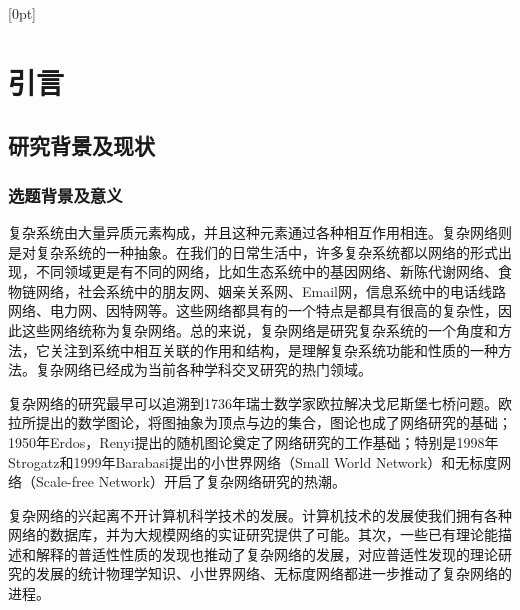\documentclass[a4paper,12pt,openany,oneside,utf-8]{ctexbook}
\newcommand{\xiaowuhao}{\fontsize{9pt}{\baselineskip}\selectfont}
\begin{document}
	
	\newpage
	\begin{spacing}{1.8}
		\tableofcontents
		[0pt]{\addvspace{2pt}\filright}
		{\contentspush{\thecontentslabel\ }}
		{}{\contentspage}
	\end{spacing}
	
	\mainmatter
	\fancyfoot[EC,OC]{\hspace*{1 em}\thepage{}\hspace*{1 em}}
	\normalsize
	\chapter[引言]{引言}\fancyhead[C]{\xiaowuhao}
	\section{研究背景及现状}
	\subsection{选题背景及意义}
	复杂系统由大量异质元素构成，并且这种元素通过各种相互作用相连。复杂网络则是对复杂系统的一种抽象。在我们的日常生活中，许多复杂系统\cite{ref1}都以网络的形式出现，不同领域更是有不同的网络，比如生态系统中的基因网络、新陈代谢网络、食物链网络，社会系统中的朋友网、姻亲关系网、Email网，信息系统中的电话线路网络、电力网、因特网等。这些网络都具有的一个特点是都具有很高的复杂性，因此这些网络统称为复杂网络。总的来说，复杂网络是研究复杂系统的一个角度和方法，它关注到系统中相互关联的作用和结构，是理解复杂系统功能和性质的一种方法。复杂网络已经成为当前各种学科交叉研究的热门领域。
	
	复杂网络的研究最早可以追溯到1736年瑞士数学家欧拉解决戈尼斯堡七桥问题。欧拉所提出的数学图论，将图抽象为顶点与边的集合，图论也成了网络研究的基础；1950年Erdos，Renyi提出的随机图论奠定了网络研究的工作基础；特别是1998年Strogatz\cite{ref2}和1999年Barabasi\cite{ref3}提出的小世界网络（Small World Network）和无标度网络（Scale-free Network）开启了复杂网络研究的热潮。
	
	复杂网络的兴起离不开计算机科学技术的发展。计算机技术的发展使我们拥有各种网络的数据库，并为大规模网络的实证研究提供了可能。其次，一些已有理论能描述和解释的普适性性质的发现也推动了复杂网络的发展，对应普适性发现的理论研究的发展的统计物理学知识、小世界网络、无标度网络都进一步推动了复杂网络的进程。
	
\end{document}
